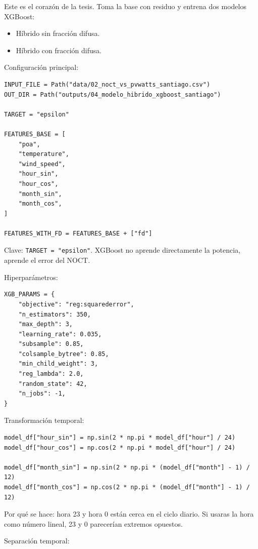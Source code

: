 \documentclass[11pt, letterpaper]{article}
\begin{document}
Este es el coraz\'on de la tesis. Toma la base con residuo y entrena dos modelos XGBoost:

\begin{itemize}
    \item H\'ibrido sin fracci\'on difusa.
    \item H\'ibrido con fracci\'on difusa.
\end{itemize}

Configuraci\'on principal:

\begin{lstlisting}[style=pythonstyle]
INPUT_FILE = Path("data/02_noct_vs_pvwatts_santiago.csv")
OUT_DIR = Path("outputs/04_modelo_hibrido_xgboost_santiago")

TARGET = "epsilon"

FEATURES_BASE = [
    "poa",
    "temperature",
    "wind_speed",
    "hour_sin",
    "hour_cos",
    "month_sin",
    "month_cos",
]

FEATURES_WITH_FD = FEATURES_BASE + ["fd"]
\end{lstlisting}

Clave: \texttt{TARGET = "epsilon"}. XGBoost no aprende directamente la potencia, aprende el error del NOCT.

Hiperpar\'ametros:

\begin{lstlisting}[style=pythonstyle]
XGB_PARAMS = {
    "objective": "reg:squarederror",
    "n_estimators": 350,
    "max_depth": 3,
    "learning_rate": 0.035,
    "subsample": 0.85,
    "colsample_bytree": 0.85,
    "min_child_weight": 3,
    "reg_lambda": 2.0,
    "random_state": 42,
    "n_jobs": -1,
}
\end{lstlisting}

Transformaci\'on temporal:

\begin{lstlisting}[style=pythonstyle]
model_df["hour_sin"] = np.sin(2 * np.pi * model_df["hour"] / 24)
model_df["hour_cos"] = np.cos(2 * np.pi * model_df["hour"] / 24)

model_df["month_sin"] = np.sin(2 * np.pi * (model_df["month"] - 1) / 12)
model_df["month_cos"] = np.cos(2 * np.pi * (model_df["month"] - 1) / 12)
\end{lstlisting}

Por qu\'e se hace: hora 23 y hora 0 est\'an cerca en el ciclo diario. Si usaras la hora como n\'umero lineal, 23 y 0 parecer\'ian extremos opuestos.

Separaci\'on temporal:
\end{document}
